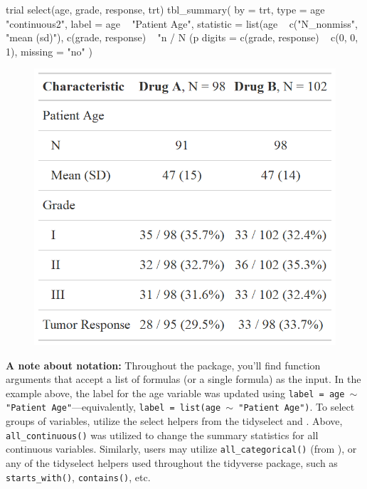 \begin{example}
trial %
  select(age, grade, response, trt) %
  tbl_summary(
    by = trt,
    type = age ~ "continuous2",
    label = age ~ "Patient Age",
    statistic = list(age ~ c("{N_nonmiss}", "{mean} ({sd})"),
                     c(grade, response) ~ "{n} / {N} ({p}%
    digits = c(grade, response) ~ c(0, 0, 1),
    missing = "no"
  )
\end{example}
\begin{figure}[h!]
  \includegraphics[scale=0.28]{summary_plus.png}
  \centering
\end{figure}

\textbf{A note about notation:}
Throughout the  package, you'll find function arguments that accept a list of formulas (or a single formula) as the input.
In the example above, the label for the age variable was updated using \texttt{label = age $\sim$ "Patient Age"}---equivalently, \texttt{label = list(age $\sim$ "Patient Age")}.
To select groups of variables, utilize the select helpers from the tidyselect \citep{tidyselect} and .
Above, \texttt{all\_continuous()} was utilized to change the summary statistics for all continuous variables. 
Similarly, users may utilize \texttt{all\_categorical()} (from ), or any of the tidyselect helpers used throughout the tidyverse \citep{tidyverse} package, such as \texttt{starts\_with()}, \texttt{contains()}, etc.

